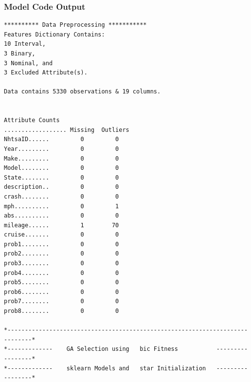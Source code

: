 \documentclass[12pt]{article}
\begin{document}
\subsubsection{Model Code Output}
\begin{verbatim}
********** Data Preprocessing ***********
Features Dictionary Contains:
10 Interval, 
3 Binary, 
3 Nominal, and 
3 Excluded Attribute(s).

Data contains 5330 observations & 19 columns.


Attribute Counts
.................. Missing  Outliers
NhtsaID......         0         0
Year.........         0         0
Make.........         0         0
Model........         0         0
State........         0         0
description..         0         0
crash........         0         0
mph..........         0         1
abs..........         0         0
mileage......         1        70
cruise.......         0         0
prob1........         0         0
prob2........         0         0
prob3........         0         0
prob4........         0         0
prob5........         0         0
prob6........         0         0
prob7........         0         0
prob8........         0         0

*-----------------------------------------------------------------------------*
*-------------    GA Selection using   bic Fitness           -----------------*
*-------------    sklearn Models and   star Initialization   -----------------*


\end{verbatim}
\end{document}
